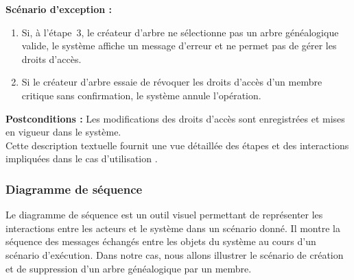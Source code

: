 \textbf{Scénario d'exception :}
\begin{enumerate}
  \item Si, à l’étape 3, le créateur d'arbre ne sélectionne pas un arbre généalogique
    valide, le système affiche un message d'erreur et ne permet pas de gérer les droits d'accès.

  \item Si le créateur d'arbre essaie de révoquer les droits d'accès d'un membre
    critique sans confirmation, le système annule l'opération.
\end{enumerate}

\textbf{Postconditions :} Les modifications des droits d'accès sont enregistrées
et mises en vigueur dans le système.
\\

Cette description textuelle fournit une vue détaillée des étapes et des
interactions impliquées dans le cas d’utilisation .


\subsubsection{Diagramme de séquence}

Le diagramme de séquence est un outil visuel permettant de représenter les
interactions entre les acteurs et le système dans un scénario donné. Il montre
la séquence des messages échangés entre les objets du système au cours d’un
scénario d’exécution. Dans notre cas, nous allons illustrer le scénario de
création et de suppression d’un arbre généalogique par un membre.


